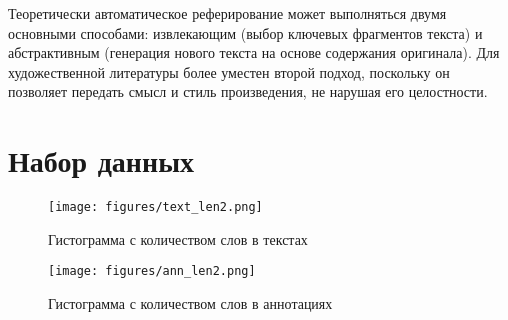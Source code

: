 \documentclass{article}
\theoremstyle{definition}
\theoremstyle{plain}
\begin{document}
Теоретически автоматическое реферирование может выполняться двумя основными способами: извлекающим (выбор ключевых фрагментов текста) и абстрактивным (генерация нового текста на основе содержания оригинала). Для художественной литературы более уместен второй подход, поскольку он позволяет передать смысл и стиль произведения, не нарушая его целостности.

\section*{Набор данных}
\begin{figure}[h!]
    \centering
    \begin{minipage}[t]{0.48\textwidth}
        \centering
        \texttt{[image: figures/text\_len2.png]}
        \caption{Гистограмма с количеством слов в текстах}
        \label{fig:text_len}
    \end{minipage}
    \hfill
    \begin{minipage}[t]{0.48\textwidth}
        \centering
        \texttt{[image: figures/ann\_len2.png]}
        \caption{Гистограмма с количеством слов в аннотациях}
        \label{fig:ann_len}
    \end{minipage}
\end{figure}
\end{document}

